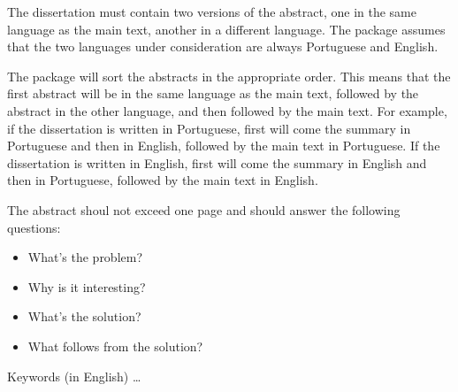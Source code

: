 The dissertation must contain two versions of the abstract, one in the same language as the main text, another in a different language.  The package assumes that the two languages under consideration are always Portuguese and English.

The package will sort the abstracts in the appropriate order. This means that the first abstract will be in the same language as the main text, followed by the abstract in the other language, and then followed by the main text. For example, if the dissertation is written in Portuguese, first will come the summary in Portuguese and then in English, followed by the main text in Portuguese. If the dissertation is written in English, first will come the summary in English and then in Portuguese, followed by the main text in English.

The abstract shoul not exceed one page and should answer the following questions:

\begin{itemize}
	\item What's the problem?
	\item Why is it interesting?
	\item What's the solution?
	\item What follows from the solution?
\end{itemize}

\begin{keywords}
Keywords (in English) \ldots
\end{keywords} 
